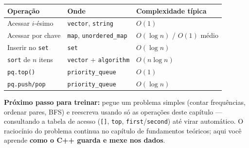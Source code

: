 \begin{center}
\small
\begin{tabular}{@{}lll@{}}
  \toprule
  \textbf{Operação} & \textbf{Onde} & \textbf{Complexidade típica} \\
  \midrule
  Acessar $i$-ésimo & \texttt{vector}, \texttt{string} & $O(1)$ \\
  Acessar por chave & \texttt{map}, \texttt{unordered\_map} & $O(\log n)$ / $O(1)$ médio \\
  Inserir no \texttt{set} & \texttt{set} & $O(\log n)$ \\
  \texttt{sort} de $n$ itens & \texttt{vector} + \texttt{algorithm} & $O(n \log n)$ \\
  \texttt{pq.top()} & \texttt{priority\_queue} & $O(1)$ \\
  \texttt{pq.push/pop} & \texttt{priority\_queue} & $O(\log n)$ \\
  \bottomrule
\end{tabular}
\end{center}

\medskip
\noindent\textbf{Próximo passo para treinar:} pegue um problema simples (contar frequências, ordenar pares, BFS) e reescreva usando só as operações deste capítulo --- consultando a tabela de acesso (\texttt{[]}, \texttt{top}, \texttt{first}/\texttt{second}) até virar automático. O raciocínio do problema continua no capítulo de fundamentos teóricos; aqui você aprende \textbf{como o C++ guarda e mexe nos dados}.
